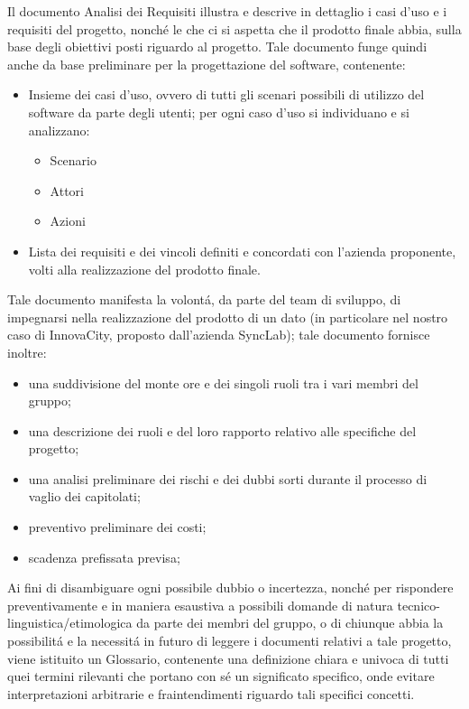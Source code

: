 Il documento Analisi dei Requisiti illustra e descrive in dettaglio i casi d'uso e i requisiti del progetto, nonché le  che ci si aspetta che il prodotto finale abbia, sulla base degli obiettivi posti riguardo al progetto. Tale documento funge quindi anche da base preliminare per la progettazione del software, contenente:
\begin{itemize}
    \item Insieme dei casi d'uso, ovvero di tutti gli scenari possibili di utilizzo del software da parte degli utenti; per ogni caso d'uso si individuano e si analizzano: 
    \begin{itemize}
        \item Scenario
        \item Attori
        \item Azioni
    \end{itemize} 
    \item Lista dei requisiti e dei vincoli definiti e concordati con l'azienda proponente, volti alla realizzazione del prodotto finale.
\end{itemize}

Tale documento manifesta la volontá, da parte del team di sviluppo, di impegnarsi nella realizzazione del prodotto di un dato  (in particolare nel nostro caso di InnovaCity, proposto dall'azienda SyncLab); tale documento fornisce inoltre:
\begin{itemize}
    \item una suddivisione del monte ore e dei singoli ruoli tra i vari membri del gruppo;
    \item una descrizione dei ruoli e del loro rapporto relativo alle specifiche del progetto;
    \item una analisi preliminare dei rischi e dei dubbi sorti durante il processo di vaglio dei capitolati;
    \item preventivo preliminare dei costi;
    \item scadenza prefissata previsa;
\end{itemize}

Ai fini di disambiguare ogni possibile dubbio o incertezza, nonché per rispondere preventivamente e in maniera esaustiva a possibili domande di natura tecnico-linguistica/etimologica da parte dei membri del gruppo, o di chiunque abbia la possibilitá e la necessitá in futuro di leggere i documenti relativi a tale progetto, viene istituito un Glossario, contenente una definizione chiara e univoca di tutti quei termini rilevanti che portano con sé un significato specifico, onde evitare interpretazioni arbitrarie e fraintendimenti riguardo tali specifici concetti.

